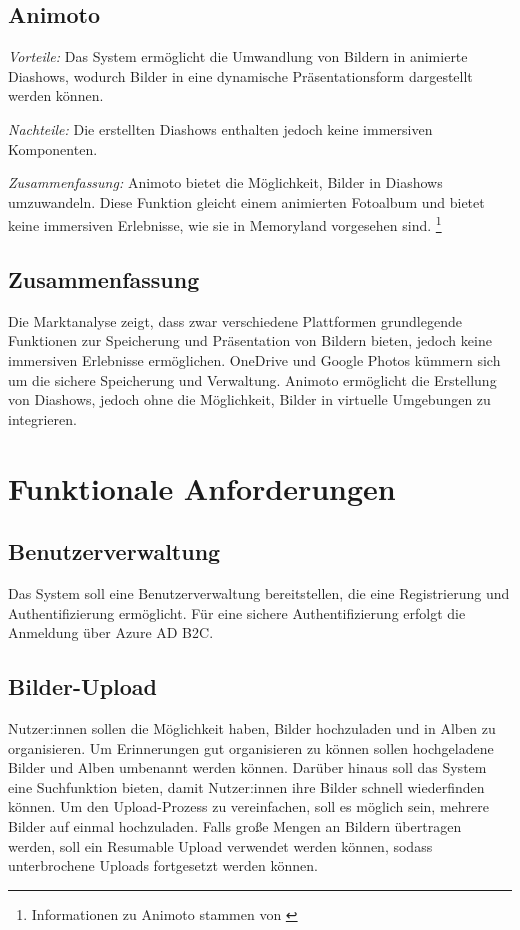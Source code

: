 \subsection{Animoto}

\emph{Vorteile:}
Das System ermöglicht die Umwandlung von Bildern in animierte Diashows,
wodurch Bilder in eine dynamische Präsentationsform dargestellt werden
können.

\emph{Nachteile:}
Die erstellten Diashows enthalten jedoch keine immersiven Komponenten.

\emph{Zusammenfassung:}
Animoto bietet die Möglichkeit, Bilder in Diashows umzuwandeln. Diese Funktion gleicht 
einem animierten Fotoalbum und bietet keine immersiven Erlebnisse, wie sie in Memoryland
vorgesehen sind. \footnote{Informationen zu Animoto stammen von \cite{Animoto}}

\subsection{Zusammenfassung}

Die Marktanalyse zeigt, dass zwar verschiedene Plattformen grundlegende 
Funktionen zur Speicherung und Präsentation von Bildern bieten, jedoch 
keine immersiven Erlebnisse ermöglichen. OneDrive und Google Photos kümmern 
sich um die sichere Speicherung und Verwaltung. Animoto ermöglicht die 
Erstellung von Diashows, jedoch ohne die Möglichkeit, Bilder in virtuelle 
Umgebungen zu integrieren.

\section{Funktionale Anforderungen}

\subsection{Benutzerverwaltung}

Das System soll eine Benutzerverwaltung bereitstellen, die eine Registrierung 
und Authentifizierung ermöglicht. Für eine sichere Authentifizierung erfolgt
die Anmeldung über Azure AD B2C.

\subsection{Bilder-Upload}

Nutzer:innen sollen die Möglichkeit haben, Bilder hochzuladen und in Alben zu organisieren. 
Um Erinnerungen gut organisieren zu können sollen hochgeladene Bilder und Alben 
umbenannt werden können. Darüber hinaus soll das System eine Suchfunktion bieten, 
damit Nutzer:innen ihre Bilder schnell wiederfinden können. Um den Upload-Prozess zu 
vereinfachen, soll es möglich sein, mehrere Bilder auf einmal hochzuladen. Falls 
gro\ss{}e Mengen an Bildern übertragen werden, soll ein Resumable Upload verwendet werden
können, sodass unterbrochene Uploads fortgesetzt werden können.

